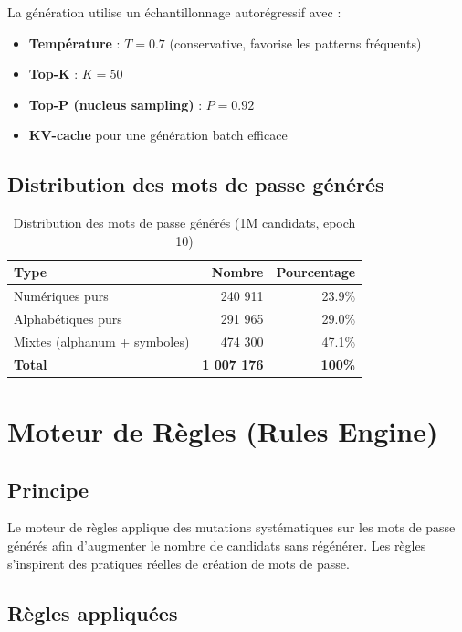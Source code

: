 \documentclass[12pt,a4paper]{article}
\begin{document}
La génération utilise un échantillonnage autorégressif avec :
\begin{itemize}
    \item \textbf{Température} : $T = 0.7$ (conservative, favorise les patterns fréquents)
    \item \textbf{Top-K} : $K = 50$
    \item \textbf{Top-P (nucleus sampling)} : $P = 0.92$
    \item \textbf{KV-cache} pour une génération batch efficace
\end{itemize}

\subsection{Distribution des mots de passe générés}

\begin{table}[H]
\centering
\begin{tabular}{lrr}
\toprule
\textbf{Type} & \textbf{Nombre} & \textbf{Pourcentage} \\
\midrule
Numériques purs & 240 911 & 23.9\% \\
Alphabétiques purs & 291 965 & 29.0\% \\
Mixtes (alphanum + symboles) & 474 300 & 47.1\% \\
\midrule
\textbf{Total} & \textbf{1 007 176} & \textbf{100\%} \\
\bottomrule
\end{tabular}
\caption{Distribution des mots de passe générés (1M candidats, epoch 10)}
\end{table}

\section{Moteur de Règles (Rules Engine)}

\subsection{Principe}

Le moteur de règles applique des mutations systématiques sur les mots de passe générés afin d'augmenter le nombre de candidats sans régénérer. Les règles s'inspirent des pratiques réelles de création de mots de passe.

\subsection{Règles appliquées}
\end{document}
